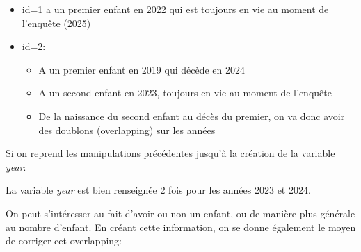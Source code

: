 \documentclass[
  12pt,
  letterpaper,
  DIV=11,
  numbers=noendperiod,
  onepage,
  openany]{scrreprt}
\newenvironment{Shaded}{\begin{snugshade}}{\end{snugshade}}
\newcommand{\AttributeTok}[1]{\textcolor[rgb]{0.80,0.80,0.80}{#1}}
\newcommand{\CommentTok}[1]{\textcolor[rgb]{0.50,0.62,0.50}{#1}}
\newcommand{\DecValTok}[1]{\textcolor[rgb]{0.86,0.86,0.80}{#1}}
\newcommand{\FunctionTok}[1]{\textcolor[rgb]{0.94,0.94,0.56}{#1}}
\newcommand{\NormalTok}[1]{\textcolor[rgb]{0.80,0.80,0.80}{#1}}
\newcommand{\OtherTok}[1]{\textcolor[rgb]{0.94,0.94,0.56}{#1}}
\newcommand{\SpecialCharTok}[1]{\textcolor[rgb]{0.86,0.64,0.64}{#1}}
\providecommand{\tightlist}{%
  \setlength{\itemsep}{0pt}\setlength{\parskip}{0pt}}\usepackage{longtable,booktabs,array}
\begin{document}
\begin{itemize}
\tightlist
\item
  id=1 a un premier enfant en 2022 qui est toujours en vie au moment de
  l'enquête (2025)
\item
  id=2:

  \begin{itemize}
  \tightlist
  \item
    A un premier enfant en 2019 qui décède en 2024
  \item
    A un second enfant en 2023, toujours en vie au moment de l'enquête
  \item
    De la naissance du second enfant au décès du premier, on va donc
    avoir des doublons (overlapping) sur les années
  \end{itemize}
\end{itemize}

Si on reprend les manipulations précédentes jusqu'à la création de la
variable \emph{year}:

\begin{Shaded}
\end{Shaded}

La variable \emph{year} est bien renseignée 2 fois pour les années 2023
et 2024.

On peut s'intéresser au fait d'avoir ou non un enfant, ou de manière
plus générale au nombre d'enfant. En créant cette information, on se
donne également le moyen de corriger cet overlapping:
\end{document}
